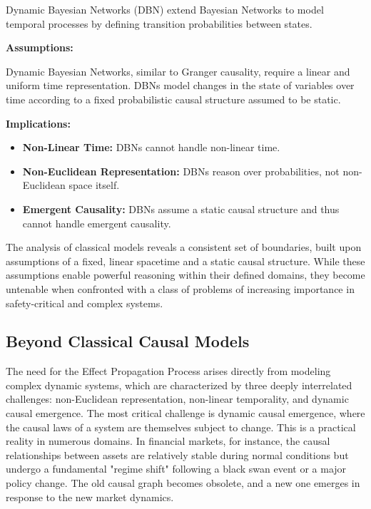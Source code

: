 Dynamic Bayesian Networks \cite{dagum1992dynamic} (DBN) extend Bayesian Networks to model temporal processes by defining transition probabilities between states.

\textbf{Assumptions:}

Dynamic Bayesian Networks, similar to Granger causality, require a linear and uniform time representation. DBNs model changes in the state of variables over time according to a fixed probabilistic causal structure assumed to be static.


\textbf{Implications:}

\begin{itemize}
    \item \textbf{Non-Linear Time:} DBNs cannot handle non-linear time.
    \item \textbf{Non-Euclidean Representation:} DBNs reason over probabilities, not non-Euclidean space itself.
    \item \textbf{Emergent Causality:}  DBNs assume a static causal structure and thus cannot handle emergent causality.
\end{itemize}

The analysis of classical models reveals a consistent set of boundaries, built upon assumptions of a fixed, linear spacetime and a static causal structure. While these assumptions enable powerful reasoning within their defined domains, they become untenable when confronted with a class of problems of increasing importance in safety-critical and complex systems. 

\subsection{Beyond Classical Causal Models}

The need for the Effect Propagation Process arises directly from modeling complex dynamic systems, which are characterized by three deeply interrelated challenges: non-Euclidean representation, non-linear temporality, and dynamic causal emergence. The most critical challenge is dynamic causal emergence, where the causal laws of a system are themselves subject to change. This is  a practical reality in numerous domains. In financial markets, for instance, the causal relationships between assets are relatively stable during normal conditions but undergo a fundamental "regime shift" following a black swan event or a major policy change. The old causal graph becomes obsolete, and a new one emerges in response to the new market dynamics.

